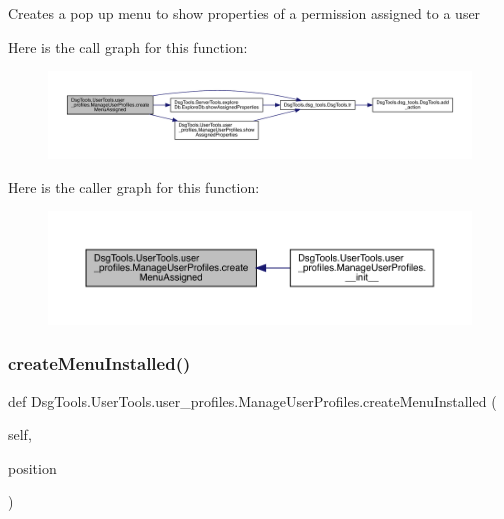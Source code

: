 \begin{DoxyVerb}Creates a pop up menu to show properties of a permission assigned to a user
\end{DoxyVerb}
 Here is the call graph for this function\+:
\nopagebreak
\begin{figure}[H]
\begin{center}
\leavevmode
\includegraphics[width=350pt]{class_dsg_tools_1_1_user_tools_1_1user__profiles_1_1_manage_user_profiles_a72cd95fef31bdbb1a3cad168c691f9d8_cgraph}
\end{center}
\end{figure}
Here is the caller graph for this function\+:
\nopagebreak
\begin{figure}[H]
\begin{center}
\leavevmode
\includegraphics[width=350pt]{class_dsg_tools_1_1_user_tools_1_1user__profiles_1_1_manage_user_profiles_a72cd95fef31bdbb1a3cad168c691f9d8_icgraph}
\end{center}
\end{figure}
\mbox{\label{class_dsg_tools_1_1_user_tools_1_1user__profiles_1_1_manage_user_profiles_a65349a082dd0ecd96d12504f393b9157}} 
\subsubsection{\texorpdfstring{create\+Menu\+Installed()}{createMenuInstalled()}}
{\footnotesize\ttfamily def Dsg\+Tools.\+User\+Tools.\+user\+\_\+profiles.\+Manage\+User\+Profiles.\+create\+Menu\+Installed (\begin{DoxyParamCaption}\item[{}]{self,  }\item[{}]{position }\end{DoxyParamCaption})}

